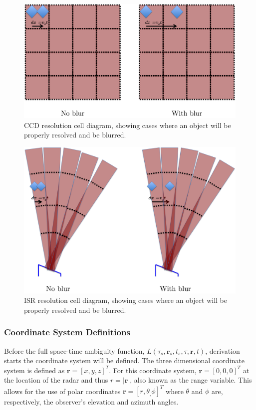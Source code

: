 \begin{figure}[h!]
\centering
	\includegraphics[width=5in]{ccddiagramall}
	\caption{CCD resolution cell diagram, showing cases where an object will be properly resolved and be blurred.}
	\label{fig:ccd}
\end{figure}

\begin{figure}[h!]
\centering
	\includegraphics[width=5in]{radardiagramall}
	\caption{ISR resolution cell diagram, showing cases where an object will be properly resolved and be blurred.}
	\label{fig:radarblur}
\end{figure}

\subsubsection{Coordinate System Definitions}

Before the full space-time ambiguity function, $L(\tau_s,\mathbf{r}_s,t_s,\tau,\mathbf{r},t)$, derivation starts the coordinate system will be defined.  The three dimensional coordinate system is defined as $\mathbf{r}=[x,y,z]^T$. For this coordinate system, $\mathbf{r}=[0,0,0]^T$ at the location of the radar and thus $r=|\mathbf{r}|$, also known as the range variable. This allows for the use of polar coordinates $\mathbf{r} =  [r,\theta_,\phi]^T$ where $\theta$ and $\phi$ are, respectively, the observer's elevation and azimuth angles.

